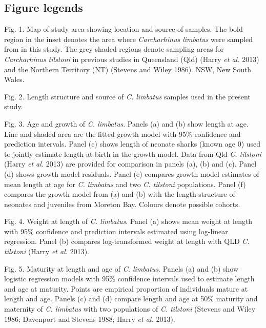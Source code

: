 \documentclass[]{article}
\title{}
\author{}
\date{}
\begin{document}
\subsection{Figure legends}\label{figure-legends}

Fig. 1. Map of study area showing location and source of samples. The
bold region in the inset denotes the area where \emph{Carcharhinus
limbatus} were sampled from in this study. The grey-shaded regions
denote sampling areas for \emph{Carcharhinus tilstoni} in previous
studies in Queensland (Qld) (Harry \emph{et al.} 2013) and the Northern
Territory (NT) (Stevens and Wiley 1986). NSW, New South Wales.

Fig. 2. Length structure and source of \emph{C. limbatus} samples used
in the present study.

Fig. 3. Age and growth of \emph{C. limbatus}. Panels (a) and (b) show
length at age. Line and shaded area are the fitted growth model with
95\% confidence and prediction intervals. Panel (c) shows length of
neonate sharks (known age 0) used to jointly estimate length-at-birth in
the growth model. Data from Qld \emph{C. tilstoni} (Harry \emph{et al.}
2013) are provided for comparison in panels (a), (b) and (c). Panel (d)
shows growth model residuals. Panel (e) compares growth model estimates
of mean length at age for \emph{C. limbatus} and two \emph{C. tilstoni}
populations. Panel (f) compares the growth model from (a) and (b) with
the length structure of neonates and juveniles from Moreton Bay. Colours
denote possible cohorts.

Fig. 4. Weight at length of \emph{C. limbatus}. Panel (a) shows mean
weight at length with 95\% confidence and prediction intervals estimated
using log-linear regression. Panel (b) compares log-transformed weight
at length with QLD \emph{C. tilstoni} (Harry \emph{et al.} 2013).

Fig. 5. Maturity at length and age of \emph{C. limbatus}. Panels (a) and
(b) show logistic regression models with 95\% confidence intervals used
to estimate length and age at maturity. Points are empirical proportion
of individuals mature at length and age. Panels (c) and (d) compare
length and age at 50\% maturity and maternity of \emph{C. limbatus} with
two populations of \emph{C. tilstoni} (Stevens and Wiley 1986; Davenport
and Stevens 1988; Harry \emph{et al.} 2013).
\end{document}
